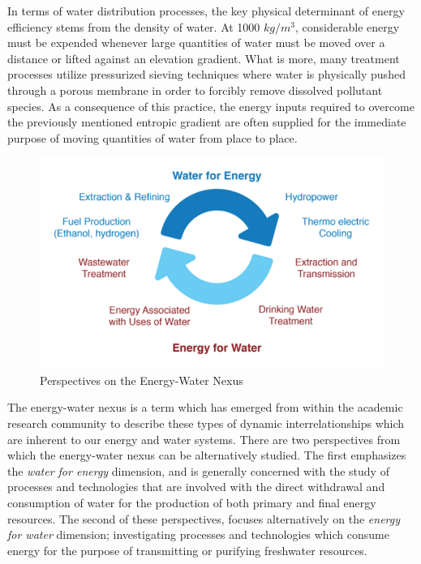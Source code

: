     In terms of water distribution processes, the key physical determinant of energy efficiency stems from the density of water. At 1000 $kg/m^3$, considerable energy must be expended whenever large quantities of water must be moved over a distance or lifted against an elevation gradient. What is more, many treatment processes utilize pressurized sieving techniques where water is physically pushed through a porous membrane in order to forcibly remove dissolved pollutant species. As a consequence of this practice, the energy inputs required to overcome the previously mentioned entropic gradient are often supplied for the immediate purpose of moving quantities of water from place to place.
    
     \begin{figure}[!h]
       \centering
       \includegraphics[width=4.5in]{figures/energy-water-nexus-perspectives.png}
       \caption[Perspectives on the Energy-Water Nexus]{Perspectives on the Energy-Water Nexus \cite{Pate2007}}
       \label{fig:energy-water-perspectives}
     \end{figure}
     
    The energy-water nexus is a term which has emerged from within the academic research community to describe these types of dynamic interrelationships which are inherent to our energy and water systems. There are two perspectives from which the energy-water nexus can be alternatively studied. The first emphasizes the \textit{water for energy} dimension, and is generally concerned with the study of processes and technologies that are involved with the direct withdrawal and consumption of water for the production of both primary and final energy resources. The second of these perspectives, focuses alternatively on the \textit{energy for water} dimension; investigating processes and technologies which consume energy for the purpose of transmitting or purifying freshwater resources. 
    
